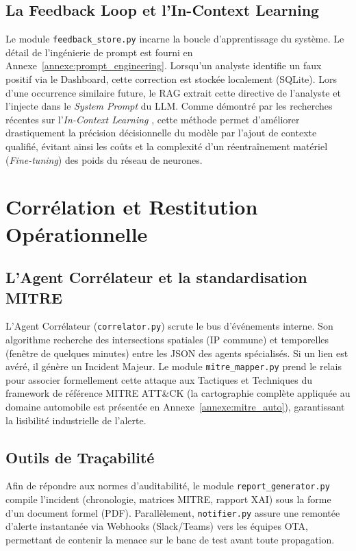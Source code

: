 \documentclass[a4paper, 12pt]{report}
\begin{document}
\subsection{La Feedback Loop et l'In-Context Learning}
Le module \texttt{feedback\_store.py} incarne la boucle d'apprentissage du système. Le détail de l'ingénierie de prompt est fourni en Annexe~\ref{annexe:prompt_engineering}. Lorsqu'un analyste identifie un faux positif via le Dashboard, cette correction est stockée localement (SQLite). Lors d'une occurrence similaire future, le RAG extrait cette directive de l'analyste et l'injecte dans le \textit{System Prompt} du LLM. 
Comme démontré par les recherches récentes sur l'\textit{In-Context Learning} \cite{dong_icl}, cette méthode permet d'améliorer drastiquement la précision décisionnelle du modèle par l'ajout de contexte qualifié, évitant ainsi les coûts et la complexité d'un réentraînement matériel (\textit{Fine-tuning}) des poids du réseau de neurones.

\section{Corrélation et Restitution Opérationnelle}
\label{sec:correlation_restitution}

\subsection{L'Agent Corrélateur et la standardisation MITRE}
L'Agent Corrélateur (\texttt{correlator.py}) scrute le bus d'événements interne. Son algorithme recherche des intersections spatiales (IP commune) et temporelles (fenêtre de quelques minutes) entre les JSON des agents spécialisés. Si un lien est avéré, il génère un Incident Majeur. Le module \texttt{mitre\_mapper.py} prend le relais pour associer formellement cette attaque aux Tactiques et Techniques du framework de référence MITRE ATT\&CK \cite{mitre_attack} (la cartographie complète appliquée au domaine automobile est présentée en Annexe~\ref{annexe:mitre_auto}), garantissant la lisibilité industrielle de l'alerte.

\subsection{Outils de Traçabilité}
Afin de répondre aux normes d'auditabilité, le module \texttt{report\_generator.py} compile l'incident (chronologie, matrices MITRE, rapport XAI) sous la forme d'un document formel (PDF). Parallèlement, \texttt{notifier.py} assure une remontée d'alerte instantanée via Webhooks (Slack/Teams) vers les équipes OTA, permettant de contenir la menace sur le banc de test avant toute propagation.
\end{document}
